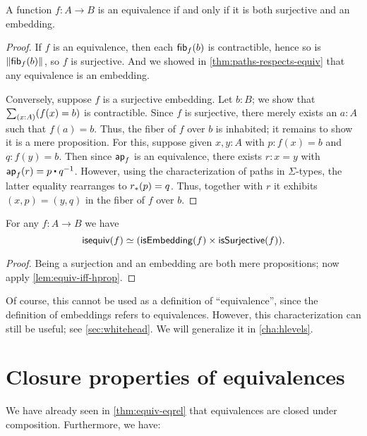 \begin{thm}\label{thm:mono-surj-equiv}
  A function $f:A\to B$ is an equivalence if and only if it is both surjective and an embedding.
\end{thm}
\begin{proof}
  If $f$ is an equivalence, then each ${\mathsf{fib}}_{f}(b)$ is contractible, hence so is $\mathopen{}\left\Vert {\mathsf{fib}}_{f}(b)\right\Vert_{}\mathclose{}$, so $f$ is surjective.
  And we showed in \autoref{thm:paths-respects-equiv} that any equivalence is an embedding.

  Conversely, suppose $f$ is a surjective embedding.
  Let $b:B$; we show that $\sm{x:A}(f(x)=b)$ is contractible.
  Since $f$ is surjective, there merely exists an $a:A$ such that $f(a)=b$.
  Thus, the fiber of $f$ over $b$ is inhabited; it remains to show it is a mere proposition.
  For this, suppose given $x,y:A$ with $p:f(x)=b$ and $q:f(y)=b$.
  Then since $\mathsf{ap}_{f}$ is an equivalence, there exists $r:x=y$ with $\apfunc f (r) = p \ct \opp q$.
  However, using the characterization of paths in $\Sigma$-types, the latter equality rearranges to ${r}_{*}\mathopen{}\left({p}\right)\mathclose{} = q$.
  Thus, together with $r$ it exhibits $(x,p) = (y,q)$ in the fiber of $f$ over $b$.
\end{proof}

\begin{cor}
  For any $f:A\to B$ we have
  \[ \mathsf{isequiv}(f) \simeq (\mathsf{isEmbedding}(f) \times \mathsf{isSurjective}(f)).\]
\end{cor}
\begin{proof}
  Being a surjection and an embedding are both mere propositions; now apply \autoref{lem:equiv-iff-hprop}.
\end{proof}

Of course, this cannot be used as a definition of ``equivalence'', since the definition of embeddings refers to equivalences.
However, this characterization can still be useful; see \autoref{sec:whitehead}.
We will generalize it in \autoref{cha:hlevels}.


\section{Closure properties of equivalences}
\label{sec:equiv-closures}
\label{sec:fiberwise-equivalences}

We have already seen in \autoref{thm:equiv-eqrel} that equivalences are closed under composition.
Furthermore, we have:

